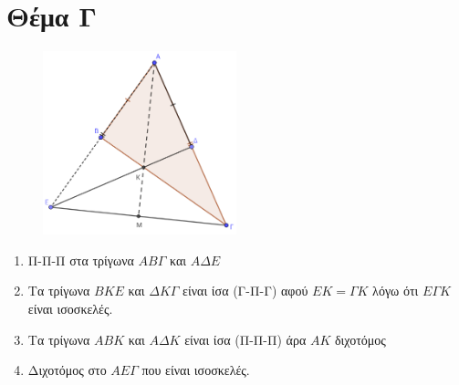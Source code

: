 \documentclass[12pt]{article}
\begin{document}
\section*{Θέμα Γ}
  \noindent
  \begin{figure}
    \centering
    \vspace{-60pt}
    \includegraphics[width=0.5\textwidth]{2017AGeoDiagLyseis}
  \end{figure}
  \begin{enumerate}
    \item Π-Π-Π στα τρίγωνα $ΑΒΓ$ και $ΑΔΕ$
    \item Τα τρίγωνα $ΒΚΕ$ και $ΔΚΓ$ είναι ίσα (Γ-Π-Γ) αφού $ΕΚ=ΓΚ$ λόγω ότι $ΕΓΚ$ είναι ισοσκελές.
    \item Τα τρίγωνα $ΑΒΚ$ και $ΑΔΚ$ είναι ίσα (Π-Π-Π) άρα $ΑΚ$ διχοτόμος
    \item Διχοτόμος στο $ΑΕΓ$ που είναι ισοσκελές.
  \end{enumerate}

\vspace{3\baselineskip}
\end{document}
